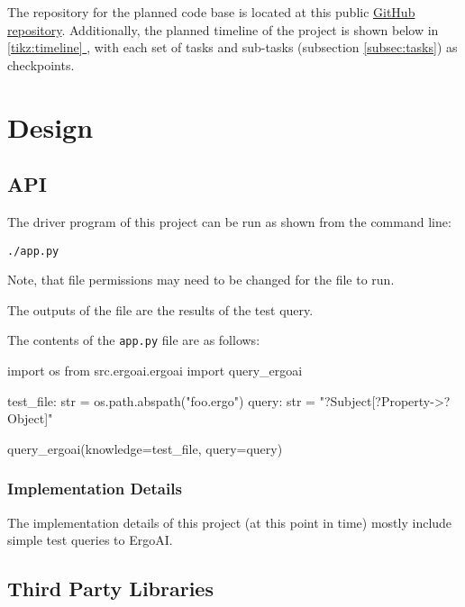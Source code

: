 \documentclass[12pt]{article}
\def \repoLink{https://github.com/AdebayoBraimah/CSE505}
\newcommand*{\fullref}[1]{\hyperref[{#1}]{\autoref*{#1} \nameref*{#1}}}
\begin{document}
    The repository for the planned code base is located at this public \href{\repoLink}{GitHub repository}. Additionally, the planned timeline of the project is shown below in \fullref{tikz:timeline}, with each set of tasks and sub-tasks (subsection \ref{subsec:tasks}) as checkpoints.
    
     \label{tikz:timeline} \newpage
    
    \section{Design}
    \label{sec:design}

    \subsection{API}
    \label{subsec:api}

    The driver program of this project can be run as shown from the command line:

    {\tt{./app.py}}

    Note, that file permissions may need to be changed for the file to run.

    The outputs of the file are the results of the test query.

    The contents of the {\tt{app.py}} file are as follows: \\

    \begin{python}
    import os
    from src.ergoai.ergoai import query_ergoai
    
    test_file: str = os.path.abspath("foo.ergo")
    query: str = "?Subject[?Property->?Object]"
    
    query_ergoai(knowledge=test_file, query=query)
    \end{python}

    \subsubsection{Implementation Details}
    \label{subsubsec:implementation}

    The implementation details of this project (at this point in time) mostly include simple test queries to ErgoAI.
    

    \subsection{Third Party Libraries}
    \label{subsec:thirdparty}
\end{document}

